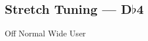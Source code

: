 \subsection[Stretch Tuning]{Stretch Tuning --- \UiKey{\I}\UiKey{\SET}D$\flat$4}









































Off
Normal
Wide
User
